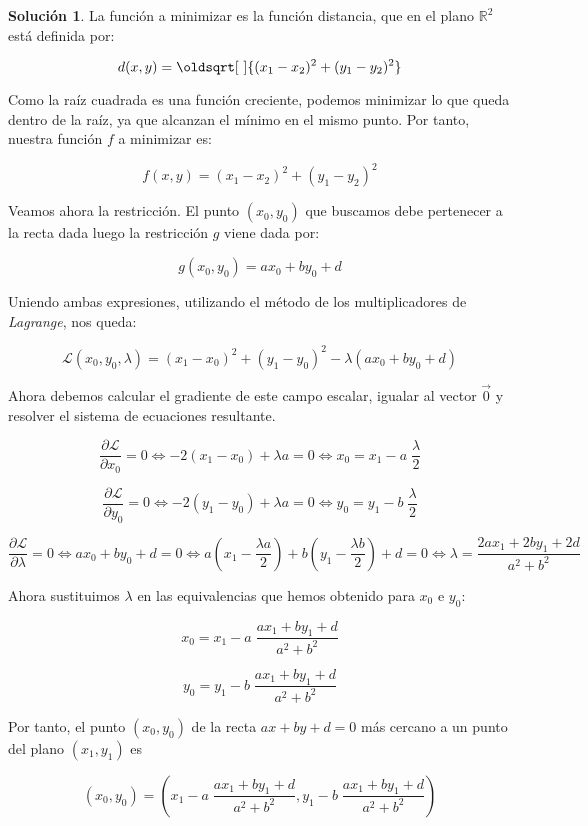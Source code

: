 \documentclass[a4paper, 11pt]{article}
\theoremstyle{definition}
\newtheorem*{solucion}{Solución}
\renewcommand*{\sqrt}[2][\ ]{\oldsqrt[#1]{#2} }
\begin{document}
  \begin{solucion}
    La función a minimizar es la función distancia, que en el plano $\mathbb{R}^2$ está definida por:

    $$ d(x,y) = \sqrt{(x_1 - x_2)^2 + (y_1-y_2)^2} $$

    Como la raíz cuadrada es una función creciente, podemos minimizar lo que queda dentro de la raíz, ya que alcanzan el mínimo en el mismo punto. Por tanto, nuestra función $f$ a minimizar es:

    $$ f(x,y) = (x_1 - x_2)^2 + (y_1-y_2)^2 $$

    Veamos ahora la restricción. El punto $(x_0,y_0)$ que buscamos debe pertenecer a la recta dada luego la restricción $g$ viene dada por:

    $$ g(x_0,y_0) = ax_0 + by_0 + d $$

    Uniendo ambas expresiones, utilizando el método de los multiplicadores de \emph{Lagrange}, nos queda:

    $$ \mathcal{L}(x_0,y_0, \lambda) = (x_1 - x_0)^2 + (y_1-y_0)^2 - \lambda (ax_0 + by_0 + d) $$

    Ahora debemos calcular el gradiente de este campo escalar, igualar al vector $\vec{0}$ y resolver el sistema de ecuaciones resultante.

    $$ \frac{\partial \mathcal{L}}{\partial x_0} = 0 \Leftrightarrow -2(x_1-x_0) + \lambda a = 0 \Leftrightarrow x_0 = x_1 - a \; \frac{\lambda}{2} $$

    $$ \frac{\partial \mathcal{L}}{\partial y_0} = 0 \Leftrightarrow -2(y_1-y_0) + \lambda a = 0 \Leftrightarrow y_0 = y_1 - b \; \frac{\lambda}{2} $$

    $$ \frac{\partial \mathcal{L}}{\partial \lambda} = 0 \Leftrightarrow ax_0 + by_0 + d = 0 \Leftrightarrow a \left( x_1 - \frac{\lambda a}{2} \right) + b \left( y_1 - \frac{\lambda b}{2} \right) + d = 0 \Leftrightarrow \lambda = \frac{2ax_1 + 2by_1 + 2d}{a^2+b^2} $$

    Ahora sustituimos $\lambda$ en las equivalencias que hemos obtenido para $x_0$ e $y_0$:

    $$ x_0 = x_1 - a \; \frac{ax_1 + by_1 + d}{a^2+b^2} $$

    $$ y_0 = y_1 - b \; \frac{ax_1 + by_1 + d}{a^2+b^2} $$

    Por tanto, el punto $(x_0,y_0)$ de la recta $ax+by+d=0$ más cercano a un punto del plano $(x_1, y_1)$ es

    $$ (x_0, y_0) = (x_1 - a \; \frac{ax_1 + by_1 + d}{a^2+b^2}, y_1 - b \; \frac{ax_1 + by_1 + d}{a^2+b^2}) $$


  \end{solucion}
\end{document}
